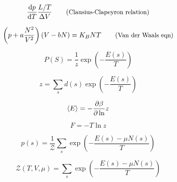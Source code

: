 \begin{equation*}
    \d{p}{T} \frac{L/T}{\Delta V} \comment{Clausius-Clapeyron relation}
\end{equation*}

\begin{equation*}
    \left(p + a\frac{N^2}{V^{2}}\right) \left(V - bN\right) = K_{B}NT \comment{Van der Waals eqn}
\end{equation*}

\begin{equation*}
    P(S) = \frac{1}{z} \exp \left(- \frac{E(s)}{T} \right)
\end{equation*}

\begin{equation*}
    z = \sum_{s} d(s) \exp \left(- \frac{E(s)}{T} \right)
\end{equation*}

\begin{equation*}
    \langle E \rangle = -\frac{\partial \beta}{\partial \ln} z
\end{equation*}

\begin{equation*}
    F = - T \ln z
\end{equation*}

\begin{equation*}
    p(s) = \frac{1}{\mathcal{Z}} \sum_{s} \exp \left(- \frac{E(s) - \mu N(s)}{T} \right)\end{equation*}

\begin{equation*}
    \mathcal{Z}(T,V,\mu) = \sum_{s} \exp \left(- \frac{E(s) - \mu N(s)}{T} \right)
\end{equation*}
